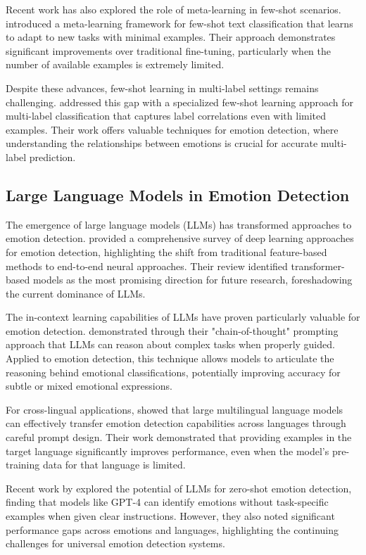 \documentclass[a4paper,12pt]{extarticle}
\begin{document}
Recent work has also explored the role of meta-learning in few-shot scenarios. \cite{wang2021meta} introduced a meta-learning framework for few-shot text classification that learns to adapt to new tasks with minimal examples. Their approach demonstrates significant improvements over traditional fine-tuning, particularly when the number of available examples is extremely limited.

Despite these advances, few-shot learning in multi-label settings remains challenging. \cite{hou2022few} addressed this gap with a specialized few-shot learning approach for multi-label classification that captures label correlations even with limited examples. Their work offers valuable techniques for emotion detection, where understanding the relationships between emotions is crucial for accurate multi-label prediction.

\subsection{Large Language Models in Emotion Detection}

The emergence of large language models (LLMs) has transformed approaches to emotion detection. \cite{alhussain2021deep} provided a comprehensive survey of deep learning approaches for emotion detection, highlighting the shift from traditional feature-based methods to end-to-end neural approaches. Their review identified transformer-based models as the most promising direction for future research, foreshadowing the current dominance of LLMs.

The in-context learning capabilities of LLMs have proven particularly valuable for emotion detection. \cite{wei2022chain} demonstrated through their "chain-of-thought" prompting approach that LLMs can reason about complex tasks when properly guided. Applied to emotion detection, this technique allows models to articulate the reasoning behind emotional classifications, potentially improving accuracy for subtle or mixed emotional expressions.

For cross-lingual applications, \cite{winata2021language} showed that large multilingual language models can effectively transfer emotion detection capabilities across languages through careful prompt design. Their work demonstrated that providing examples in the target language significantly improves performance, even when the model's pre-training data for that language is limited.

Recent work by \cite{zhang2023emotion} explored the potential of LLMs for zero-shot emotion detection, finding that models like GPT-4 can identify emotions without task-specific examples when given clear instructions. However, they also noted significant performance gaps across emotions and languages, highlighting the continuing challenges for universal emotion detection systems.
\end{document}
